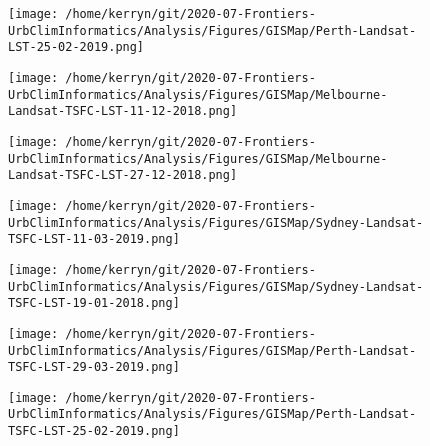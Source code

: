 \documentclass{article}
\begin{document}
\begin{figure}
\centering    
\texttt{[image: /home/kerryn/git/2020-07-Frontiers-UrbClimInformatics/Analysis/Figures/GISMap/Perth-Landsat-LST-25-02-2019.png]}
\end{figure} 
\clearpage



\begin{figure}
\centering    
\texttt{[image: /home/kerryn/git/2020-07-Frontiers-UrbClimInformatics/Analysis/Figures/GISMap/Melbourne-Landsat-TSFC-LST-11-12-2018.png]}
\end{figure} 
\clearpage


\begin{figure}
\centering    
\texttt{[image: /home/kerryn/git/2020-07-Frontiers-UrbClimInformatics/Analysis/Figures/GISMap/Melbourne-Landsat-TSFC-LST-27-12-2018.png]}
\end{figure} 
\clearpage

\begin{figure}
\centering    
\texttt{[image: /home/kerryn/git/2020-07-Frontiers-UrbClimInformatics/Analysis/Figures/GISMap/Sydney-Landsat-TSFC-LST-11-03-2019.png]}
\end{figure} 
\clearpage


\begin{figure}
\centering    
\texttt{[image: /home/kerryn/git/2020-07-Frontiers-UrbClimInformatics/Analysis/Figures/GISMap/Sydney-Landsat-TSFC-LST-19-01-2018.png]}
\end{figure} 
\clearpage

\begin{figure}
\centering    
\texttt{[image: /home/kerryn/git/2020-07-Frontiers-UrbClimInformatics/Analysis/Figures/GISMap/Perth-Landsat-TSFC-LST-29-03-2019.png]}
\end{figure} 
\clearpage


\begin{figure}
\centering    
\texttt{[image: /home/kerryn/git/2020-07-Frontiers-UrbClimInformatics/Analysis/Figures/GISMap/Perth-Landsat-TSFC-LST-25-02-2019.png]}
\end{figure} 
\clearpage
\end{document}
